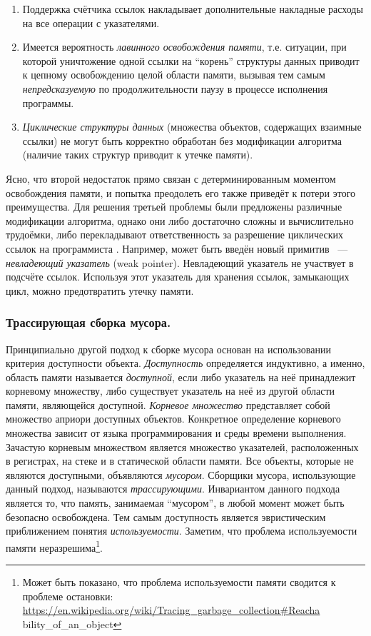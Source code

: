 \begin{enumerate}
\item 
	Поддержка счётчика ссылок накладывает дополнительные накладные расходы на все 
	операции с указателями.
\item 
	Имеется вероятность \emph{лавинного освобождения памяти}, т.е. ситуации, 
	при которой уничтожение одной ссылки на ``корень'' структуры данных приводит 
	к цепному освобождению целой области памяти, вызывая тем самым 
	\emph{непредсказуемую} по продолжительности паузу в процессе исполнения программы.
\item 
	\emph{Циклические структуры данных} (множества объектов, содержащих взаимные ссылки) 
	не могут быть корректно обработан без модификации алгоритма 
	(наличие таких структур приводит к утечке памяти).
\end{enumerate}

Ясно, что второй недостаток прямо связан с детерминированным моментом освобождения памяти, 
и попытка преодолеть его также приведёт к потери этого преимущества. 
Для решения третьей проблемы были предложены различные модификации алгоритма, 
однако они либо достаточно сложны и вычислительно трудоёмки, либо перекладывают 
ответственность за разрешение циклических ссылок на программиста \cite{book:jones1996garbage}. 
Например, может быть введён новый примитив ~---~ \emph{невладеющий указатель} (weak pointer). 
Невладеющий указатель не участвует в подсчёте ссылок. 
Используя этот указатель для хранения ссылок, замыкающих цикл, можно предотвратить 
утечку памяти.


\subsubsection{Трассирующая сборка мусора.}

Принципиально другой подход к сборке мусора основан на использовании критерия 
доступности объекта. 
\emph{Доступность} определяется индуктивно, а именно, область памяти называется 
\emph{доступной}, если либо указатель на неё принадлежит корневому множеству, 
либо существует указатель на неё из другой области памяти, являющейся доступной. 
\emph{Корневое множество} представляет собой множество априори доступных объектов. 
Конкретное определение корневого множества зависит от языка программирования и среды 
времени выполнения. 
Зачастую корневым множеством является множество указателей, расположенных в регистрах, 
на стеке и в статической области памяти. 
Все объекты, которые не являются доступными, объявляются \emph{мусором}. 
Сборщики мусора, использующие данный подход, называются \emph{трассирующими}. 
Инвариантом данного подхода является то, что память, занимаемая ``мусором'', в любой 
момент может быть безопасно освобождена. 
Тем самым доступность является эвристическим приближением понятия \emph{используемости}. 
Заметим, что проблема используемости памяти неразрешима\footnote{Может быть показано, что 
проблема используемости памяти сводится к проблеме остановки: \\
\url{https://en.wikipedia.org/wiki/Tracing\_garbage\_collection\#Reacha}\\{bility\_of\_an\_object}}. 

